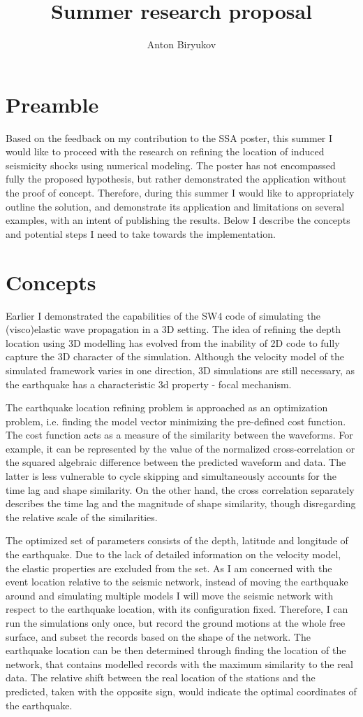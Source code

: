 \documentclass[a4paper,10pt]{article}
\title{Summer research proposal}
\author{Anton Biryukov}
\begin{document}
\maketitle
\section*{Preamble}
Based on the feedback on my contribution to the SSA poster, this summer I would like to proceed with the research on refining the location of induced seismicity shocks using numerical modeling. The poster has not encompassed fully the proposed hypothesis, but rather demonstrated the application without the proof of concept. Therefore, during this summer I would like to appropriately outline the solution, and demonstrate its application and limitations on several examples, with an intent of publishing the results. Below I describe the concepts and potential steps I need to take towards the implementation.
\section*{Concepts}
Earlier I demonstrated the capabilities of the SW4 code of simulating the (visco)elastic wave propagation in a 3D setting. The idea of refining the depth location using 3D modelling has evolved from the inability of 2D code to fully capture the 3D character of the simulation. Although the velocity model of the simulated framework varies in one direction, 3D simulations are still necessary, as the earthquake has a characteristic 3d property - focal mechanism.


The earthquake location refining problem is approached as an optimization problem, i.e. finding the model vector minimizing the pre-defined cost function. The cost function acts as a measure of the similarity between the waveforms. For example, it can be represented by the value of the normalized cross-correlation or the squared algebraic difference between the predicted waveform and data. The latter is less vulnerable to cycle skipping and simultaneously accounts for the time lag and shape similarity. On the other hand, the cross correlation separately describes the time lag and the magnitude of shape similarity, though disregarding the relative scale of the similarities. 


The optimized set of parameters consists of the depth, latitude and longitude of the earthquake. Due to the lack of detailed information on the velocity model, the elastic properties are excluded from the set. As I am concerned with the event location relative to the seismic network, instead of moving the earthquake around and simulating multiple models I will move the seismic network with respect to the earthquake location, with its configuration fixed. Therefore, I can run the simulations only once, but record the ground motions at the whole free surface, and subset the records based on the shape of the network. The earthquake location can be then determined through finding the location of the network, that contains modelled records with the maximum similarity to the real data. The relative shift between the real location of the stations and the predicted, taken with the opposite sign, would indicate the optimal coordinates of the earthquake.
\end{document}
